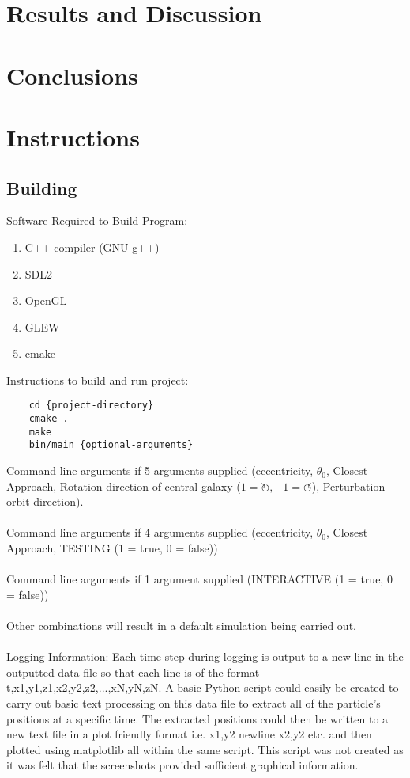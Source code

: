 \documentclass[10pt,a4paper]{article}
\begin{document}
\clearpage
\section{Results and Discussion}

\clearpage
\section{Conclusions}

\clearpage
\section{Instructions}
\subsection{Building}
Software Required to Build Program:
\\
\begin{enumerate}
\item C++ compiler (GNU g++)
\item SDL2
\item OpenGL
\item GLEW
\item cmake
\end{enumerate}

Instructions to build and run project:

\begin{lstlisting}
	cd {project-directory}
	cmake .
	make
	bin/main {optional-arguments}
\end{lstlisting}
Command line arguments if 5 arguments supplied (eccentricity, $\theta_0$, Closest Approach, Rotation direction of central galaxy ($1=\circlearrowright, -1=\circlearrowleft$), Perturbation orbit direction).
\\
\\
Command line arguments if 4 arguments supplied (eccentricity, $\theta_0$, Closest Approach, TESTING (1 = true, 0 = false))
\\
\\
Command line arguments if 1 argument supplied (INTERACTIVE (1 = true, 0 = false))
\\
\\
Other combinations will result in a default simulation being carried out.
\\
\\
Logging Information: Each time step during logging is output to a new line in the outputted data file so that each line is of the format t,{x1,y1,z1},{x2,y2,z2},...,{xN,yN,zN}. A basic Python script could easily be created to carry out basic text processing on this data file to extract all of the particle's positions at a specific time. The extracted positions could then be written to a new text file in a plot friendly format i.e. x1,y2 {newline} x2,y2 etc. and then plotted using matplotlib all within the same script. This script was not created as it was felt that the screenshots provided sufficient graphical information.
\end{document}
